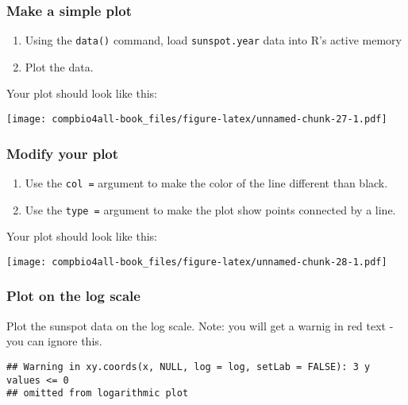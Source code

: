 \documentclass[
]{book}
\providecommand{\tightlist}{%
  \setlength{\itemsep}{0pt}\setlength{\parskip}{0pt}}
\begin{document}
\hypertarget{make-a-simple-plot}{%
\subsubsection*{Make a simple plot}\label{make-a-simple-plot}}

\begin{enumerate}
\def\labelenumi{\arabic{enumi}.}
\tightlist
\item
  Using the \texttt{data()} command, load \texttt{sunspot.year} data into R's active memory
\item
  Plot the data.
\end{enumerate}

Your plot should look like this:

\texttt{[image: compbio4all-book\_files/figure-latex/unnamed-chunk-27-1.pdf]}

\hypertarget{modify-your-plot}{%
\subsubsection*{Modify your plot}\label{modify-your-plot}}

\begin{enumerate}
\def\labelenumi{\arabic{enumi}.}
\tightlist
\item
  Use the \texttt{col\ =} argument to make the color of the line different than black.
\item
  Use the \texttt{type\ =} argument to make the plot show points connected by a line.
\end{enumerate}

Your plot should look like this:

\texttt{[image: compbio4all-book\_files/figure-latex/unnamed-chunk-28-1.pdf]}

\hypertarget{plot-on-the-log-scale}{%
\subsubsection*{Plot on the log scale}\label{plot-on-the-log-scale}}

Plot the sunspot data on the log scale. Note: you will get a warnig in red text - you can ignore this.

\begin{verbatim}
## Warning in xy.coords(x, NULL, log = log, setLab = FALSE): 3 y values <= 0
## omitted from logarithmic plot
\end{verbatim}
\end{document}
